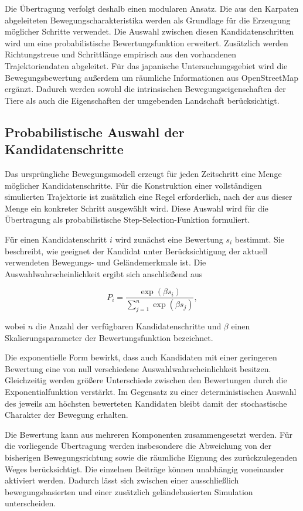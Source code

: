 \documentclass[12pt,a4paper]{report}
\begin{document}
Die Übertragung verfolgt deshalb einen modularen Ansatz. Die aus den Karpaten
abgeleiteten Bewegungscharakteristika werden als Grundlage für die Erzeugung
möglicher Schritte verwendet. Die Auswahl zwischen diesen Kandidatenschritten wird
um eine probabilistische Bewertungsfunktion erweitert. Zusätzlich werden
Richtungstreue und Schrittlänge empirisch aus den vorhandenen Trajektoriendaten
abgeleitet. Für das japanische Untersuchungsgebiet wird die Bewegungsbewertung
außerdem um räumliche Informationen aus OpenStreetMap ergänzt. Dadurch werden sowohl
die intrinsischen Bewegungseigenschaften der Tiere als auch die Eigenschaften der
umgebenden Landschaft berücksichtigt.

\subsection{Probabilistische Auswahl der Kandidatenschritte}
\label{subsec:neuimplementierung}

Das ursprüngliche Bewegungsmodell erzeugt für jeden Zeitschritt eine Menge möglicher
Kandidatenschritte. Für die Konstruktion einer vollständigen simulierten Trajektorie
ist zusätzlich eine Regel erforderlich, nach der aus dieser Menge ein konkreter
Schritt ausgewählt wird. Diese Auswahl wird für die Übertragung als probabilistische
Step-Selection-Funktion formuliert.

Für einen Kandidatenschritt $i$ wird zunächst eine Bewertung $s_i$ bestimmt. Sie
beschreibt, wie geeignet der Kandidat unter Berücksichtigung der aktuell
verwendeten Bewegungs- und Geländemerkmale ist. Die Auswahlwahrscheinlichkeit ergibt
sich anschließend aus

\begin{equation}
P_i =
\frac{\exp(\beta s_i)}
{\sum_{j=1}^{n}\exp(\beta s_j)},
\label{eq:step_selection}
\end{equation}

wobei $n$ die Anzahl der verfügbaren Kandidatenschritte und $\beta$ einen
Skalierungsparameter der Bewertungsfunktion bezeichnet.

Die exponentielle Form bewirkt, dass auch Kandidaten mit einer geringeren Bewertung
eine von null verschiedene Auswahlwahrscheinlichkeit besitzen. Gleichzeitig werden
größere Unterschiede zwischen den Bewertungen durch die Exponentialfunktion
verstärkt. Im Gegensatz zu einer deterministischen Auswahl des jeweils am höchsten
bewerteten Kandidaten bleibt damit der stochastische Charakter der Bewegung erhalten.

Die Bewertung kann aus mehreren Komponenten zusammengesetzt werden. Für die
vorliegende Übertragung werden insbesondere die Abweichung von der bisherigen
Bewegungsrichtung sowie die räumliche Eignung des zurückzulegenden Weges
berücksichtigt. Die einzelnen Beiträge können unabhängig voneinander aktiviert
werden. Dadurch lässt sich zwischen einer ausschließlich bewegungsbasierten und
einer zusätzlich geländebasierten Simulation unterscheiden.
\end{document}
